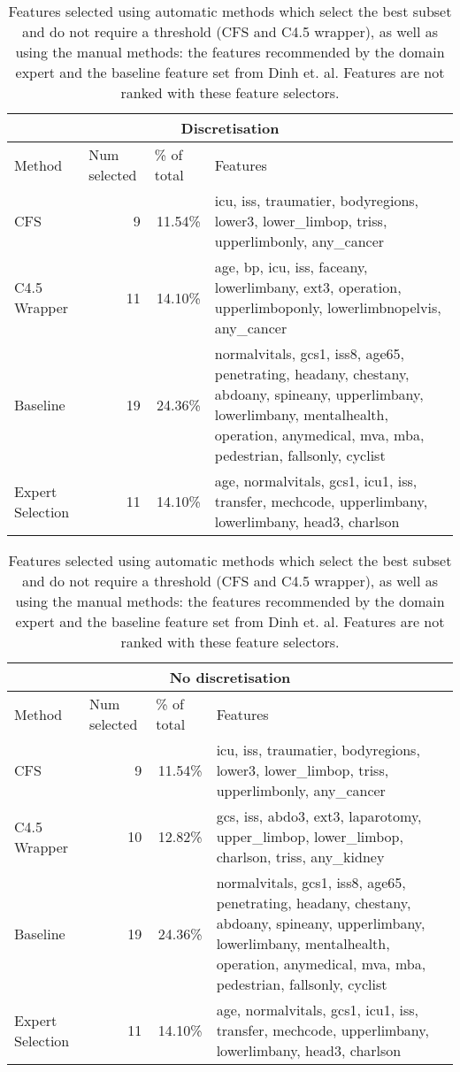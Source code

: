 \begin{table}[hbp]
\caption{Features selected using automatic methods which select the best subset and do not require a threshold (CFS and C4.5 wrapper), as well as using the manual methods: the features recommended by the domain expert and the baseline feature set from Dinh et. al. Features are not ranked with these feature selectors.}
\begin{tabular}{|l|r|r|p{8.5cm}|}
\hline
\multicolumn{ 4}{|c|}{Discretisation} \\ \hline
Method & \multicolumn{1}{l|}{Num selected} & \multicolumn{1}{l|}{\% of total} & Features \\ \hline
CFS & 9 & 11.54\% & icu, iss, traumatier, bodyregions, lower3, lower\_limbop, triss, upperlimbonly, any\_cancer \\ \hline
C4.5 Wrapper & 11 & 14.10\% & age, bp, icu, iss, faceany, lowerlimbany, ext3, operation, upperlimboponly, lowerlimbnopelvis, any\_cancer \\ \hline
Baseline & 19 & 24.36\% & normalvitals, gcs1, iss8, age65, penetrating, headany, chestany, abdoany, spineany, upperlimbany, lowerlimbany, mentalhealth, operation, anymedical, mva, mba, pedestrian, fallsonly, cyclist \\ \hline
Expert Selection & 11 & 14.10\% & age, normalvitals, gcs1, icu1, iss, transfer, mechcode, upperlimbany, lowerlimbany, head3, charlson \\ \hline
\end{tabular}
\vspace{0.4cm}
\vfill
\begin{tabular}{|l|r|r|p{8.5cm}|}
\hline
\multicolumn{ 4}{|c|}{No discretisation} \\ \hline
Method & \multicolumn{1}{l|}{Num selected} & \multicolumn{1}{l|}{\% of total} & Features \\ \hline
CFS & 9 & 11.54\% & icu, iss, traumatier, bodyregions, lower3, lower\_limbop, triss, upperlimbonly, any\_cancer \\ \hline
C4.5 Wrapper & 10 & 12.82\% & gcs, iss, abdo3, ext3, laparotomy, upper\_limbop, lower\_limbop, charlson, triss, any\_kidney \\ \hline
Baseline & 19 & 24.36\% & normalvitals, gcs1, iss8, age65, penetrating, headany, chestany, abdoany, spineany, upperlimbany, lowerlimbany, mentalhealth, operation, anymedical, mva, mba, pedestrian, fallsonly, cyclist \\ \hline
Expert Selection & 11 & 14.10\% & age, normalvitals, gcs1, icu1, iss, transfer, mechcode, upperlimbany, lowerlimbany, head3, charlson \\ \hline
\end{tabular}
\end{table}
